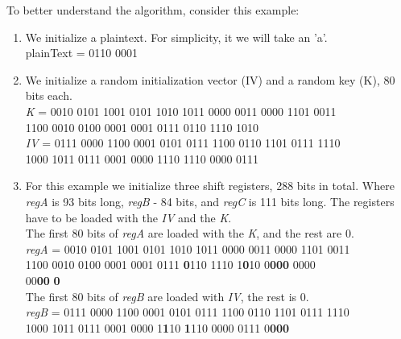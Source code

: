 	To better understand the algorithm, consider this example:
	\begin{enumerate}
		\setlength\itemsep{0.1em}
		\item We initialize a plaintext. For simplicity, it we will take an 'a'.\\
		{\selectfont
			plainText = 0110 0001
		}
		
		
		\item We initialize a random initialization vector (IV) and a random key (K), 80 bits each.\\
		{\selectfont
			\emph{K} = 0010 0101 1001 0101 1010 1011 0000 0011 0000 1101 0011\\
			\indent\hspace{1cm}1100 0010 0100 0001 0001 0111 0110 1110 1010
		}
		\vspace{0.5em}
		\\
		{\selectfont
			\emph{IV} = 0111 0000 1100 0001 0101 0111 1100 0110 1101 0111 1110\\ 
			\indent\hspace{1.2cm}1000 1011 0111 0001 0000 1110 1110 0000 0111
		}
		
		\item For this example we initialize three shift registers, 288 bits in total. Where \emph{regA} is 93 bits long, \emph{regB} - 84 bits, and \emph{regC} is 111 bits long. The registers have to be loaded with the \emph{IV} and the \emph{K}. \\
		The first 80 bits of \emph{regA} are loaded with the \emph{K}, and the rest are 0. 
		\vspace{0.5em}
		\\
		{\selectfont
			\emph{regA} = 0010 0101 1001 0101 1010 1011 0000 0011 0000 1101 0011 \\ 
			\indent\hspace{1.6cm}1100 0010 0100 0001 0001 0111 \textbf{0}110 1110 1\textbf{0}10 0\textbf{000}  0000\\
			\indent\hspace{1.6cm}00\textbf{00} \textbf{0}
		}
		\vspace{0.5em}
		\\
		The first 80 bits of \emph{regB} are loaded with \emph{IV}, the rest is 0. \\
		{\selectfont
			\emph{regB} = 0111 0000 1100 0001 0101 0111 1100 0110 1101 0111 1110 \\ 
			\indent\hspace{1.6cm}1000 1011 0111 0001 0000 1\textbf{1}10 \textbf{1}110 0000 0111 0\textbf{000}
		}
		

\end{enumerate}
